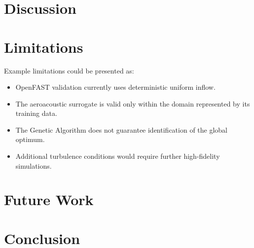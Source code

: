 \documentclass[11pt]{article}
\begin{document}
\section{Discussion}

\lipsum[20-21]



\section{Limitations}

\lipsum[22]

Example limitations could be presented as:

\begin{itemize}

    \item OpenFAST validation currently uses deterministic
    uniform inflow.

    \item The aeroacoustic surrogate is valid only within the
    domain represented by its training data.

    \item The Genetic Algorithm does not guarantee identification
    of the global optimum.

    \item Additional turbulence conditions would require further
    high-fidelity simulations.

\end{itemize}



\section{Future Work}

\lipsum[23]



\section{Conclusion}

\lipsum[24]
\end{document}
